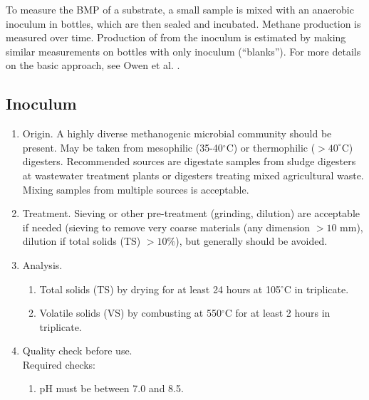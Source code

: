 

To measure the BMP of a substrate, a small sample is mixed with an anaerobic inoculum in bottles, which are then sealed and incubated. 
Methane  production is measured over time.
Production of  from the inoculum is estimated by making similar measurements on bottles with only inoculum (``blanks'').
For more details on the basic approach, see Owen et al. \cite{owen1979}.

\subsection{Inoculum}
\begin{enumerate}
  \item Origin. 
    A highly diverse methanogenic microbial community should be present.
    May be taken from mesophilic (35-40$^\circ$C) or thermophilic ($> 40^\circ$C) digesters. 
    Recommended sources are digestate samples from sludge digesters at wastewater treatment plants or digesters treating mixed agricultural waste.
    Mixing samples from multiple sources is acceptable.
  \item Treatment. 
    Sieving or other pre-treatment (grinding, dilution) are acceptable if needed (sieving to remove very coarse materials (any dimension $> 10$ mm), dilution if total solids (TS) $> 10\%$), but generally should be avoided.
  \item Analysis.
    \begin{enumerate}
      \item Total solids (TS) by drying for at least 24 hours at 105$^\circ$C in triplicate.
      \item Volatile solids (VS) by combusting at 550$^\circ$C for at least 2 hours in triplicate.
    \end{enumerate}
  \item Quality check before use.\\
    Required checks:
    \begin{enumerate}
      \item pH must be between 7.0 and 8.5.
    \end{enumerate}


\end{enumerate}
